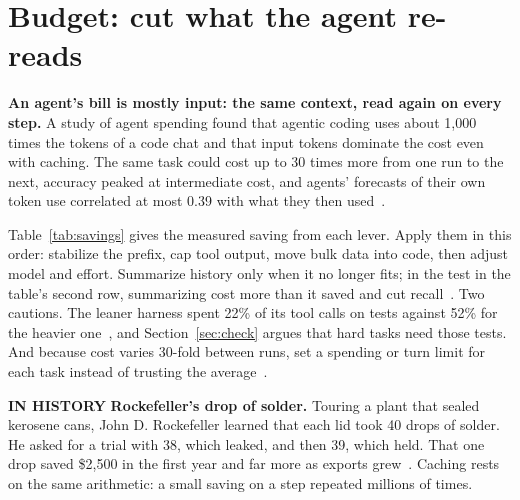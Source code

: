 \documentclass[11pt,letterpaper]{article}
\newcommand{\takeaway}[1]{\textbf{#1}}
\newcommand{\histlabel}[1]{{\sffamily\fontsize{7.6}{9.6}\selectfont\bfseries\color{muted}IN HISTORY}%
  \enspace\textbf{#1}\enspace}
\begin{document}
\section{Budget: cut what the agent re-reads}\label{sec:budget}

\takeaway{An agent's bill is mostly input: the same context, read again on every step.} A
study of agent spending found that agentic coding uses about 1,000 times the tokens of a code
chat and that input tokens dominate the cost even with caching. The same task could cost up
to 30 times more from one run to the next, accuracy peaked at intermediate cost, and agents'
forecasts of their own token use correlated at most 0.39 with what they then
used~\cite{bai}.

Table~\ref{tab:savings} gives the measured saving from each lever. Apply them in this order:
stabilize the prefix, cap tool output, move bulk data into code, then adjust model and
effort. Summarize history only when it no longer fits; in the test in the table's second
row, summarizing cost more than it saved and cut recall~\cite{bouchard}. Two cautions. The
leaner harness spent 22\% of its tool calls on tests against 52\% for the heavier
one~\cite{waste}, and Section~\ref{sec:check} argues that hard tasks need those tests. And
because cost varies 30-fold between runs, set a spending or turn limit for each task instead
of trusting the average~\cite{bai}.

\begin{history}
\histlabel{Rockefeller's drop of solder.} Touring a plant that sealed kerosene cans, John D.
Rockefeller learned that each lid took 40 drops of solder. He asked for a trial with 38, which
leaked, and then 39, which held. That one drop saved \$2,500 in the first year and far more
as exports grew~\cite{chernow}. Caching rests on the same arithmetic: a small saving on a step
repeated millions of times.
\end{history}
\end{document}
